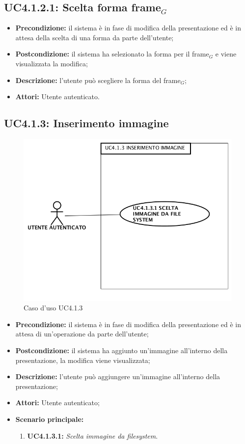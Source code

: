 \subsection{ UC4.1.2.1: Scelta forma frame$_G$}

\begin{itemize}
	\item \textbf{Precondizione:} il sistema è in fase di modifica della presentazione ed è in attesa della scelta di una forma da parte dell'utente;
	\item \textbf{Postcondizione:} il sistema ha selezionato la forma per il frame$_G$ e viene visualizzata la modifica;
	\item \textbf{Descrizione:} l'utente può scegliere la forma del frame$_G$;
	\item \textbf{Attori:} Utente autenticato.
\end{itemize}
\subsection{ UC4.1.3: Inserimento immagine}

\begin{figure}[H]
	\begin{center}
	\includegraphics[scale=0.4]{diagram/UC4-1-3.png}
	\caption{Caso d'uso UC4.1.3}
	\end{center}
\end{figure}
\begin{itemize}
	\item \textbf{Precondizione:} il sistema è in fase di modifica della presentazione ed è in attesa di un'operazione da parte dell'utente;
	\item \textbf{Postcondizione:} il sistema ha aggiunto un'immagine all'interno della presentazione, la modifica viene visualizzata;
	\item \textbf{Descrizione:} l'utente può aggiungere un'immagine all'interno della presentazione;
	\item \textbf{Attori:} Utente autenticato;
	\item \textbf{Scenario principale:}
	\begin{enumerate}
		\item \textbf{ UC4.1.3.1:} \textit{ Scelta immagine da filesystem}.
	\end{enumerate}
\end{itemize}
